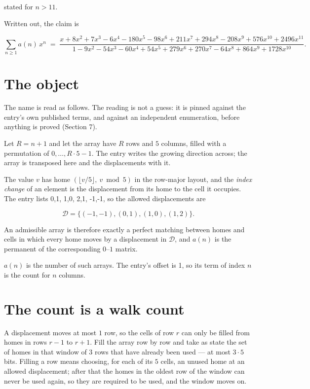 \documentclass[11pt]{article}
\theoremstyle{definition}
\begin{document}
stated for $n > 11$.

Written out, the claim is

\[\sum_{n \ge 1} a(n)\,x^n \;=\; \frac{x + 8x^{2} + 7x^{3} - 6x^{4} - 180x^{5} - 98x^{6} + 211x^{7} + 294x^{8} - 208x^{9} + 576x^{10} + 2496x^{11}}{1 - 9x^{2} - 54x^{3} - 60x^{4} + 54x^{5} + 279x^{6} + 270x^{7} - 64x^{8} + 864x^{9} + 1728x^{10}}.\]

\section{The object}

The name is read as follows. The reading is not a guess: it is pinned against the entry's own published terms, and against an independent enumeration, before anything is proved (Section 7).

Let $R = n + 1$ and let the array have $R$ rows and $5$ columns, filled with a permutation of $0,\dots,R\cdot5-1$. The entry writes the growing direction across; the array is transposed here and the displacements with it.

The value $v$ has home $(\lfloor v/5\rfloor,\ v \bmod 5)$ in the row-major layout, and the {\itshape index change} of an element is the displacement from its home to the cell it occupies. The entry lists 0,1, 1,0, 2,1, -1,-1, so the allowed displacements are

\[\mathcal{D} = \{(-1,-1), (0,1), (1,0), (1,2)\}.\]

An admissible array is therefore exactly a perfect matching between homes and cells in which every home moves by a displacement in $\mathcal{D}$, and $a(n)$ is the permanent of the corresponding $0$--$1$ matrix.

$a(n)$ is the number of such arrays. The entry's offset is 1, so its term of index $n$ is the count for $n$ columns.

\section{The count is a walk count}

A displacement moves at most $1$ row, so the cells of row $r$ can only be filled from homes in rows $r-1$ to $r+1$. Fill the array row by row and take as state the set of homes in that window of $3$ rows that have already been used --- at most $3\cdot5$ bits. Filling a row means choosing, for each of its $5$ cells, an unused home at an allowed displacement; after that the homes in the oldest row of the window can never be used again, so they are required to be used, and the window moves on.
\end{document}
